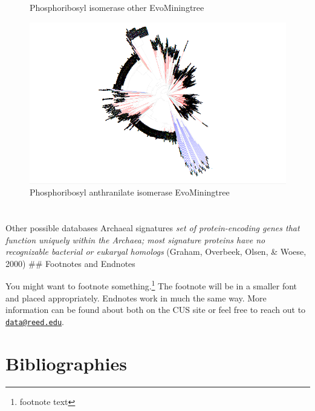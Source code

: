 \documentclass[12pt,twoside]{reedthesis}
\begin{document}
\begin{figure}[h!tbp]
  \caption[Phosphoribosyl isomerase other EvoMiningtree]{\normalsize{Phosphoribosyl isomerase other EvoMiningtree}}
  \label{fig:Phosphoribosyl_isomerase_other_evo_tree}
  \end{figure}\begin{figure}[h!tbp]
  \centering
  \includegraphics[angle = 180,scale = 0.25]{chapter3/tree65.png}
  \caption[Phosphoribosyl anthranilate isomerase EvoMiningtree]{\normalsize{Phosphoribosyl anthranilate isomerase EvoMiningtree}}
  \label{fig:Phosphoribosylanthranilate_isomerase_evo_tree}
  \end{figure}
  
  \clearpage 
  
  \hypertarget{section}{\section{}\label{section}}
  
  Other possible databases Archaeal signatures \emph{set of
  protein-encoding genes that function uniquely within the Archaea; most
  signature proteins have no recognizable bacterial or eukaryal homologs}
  (Graham, Overbeek, Olsen, \& Woese, 2000) \#\# Footnotes and Endnotes
  
  You might want to footnote something.\footnote{footnote text} The
  footnote will be in a smaller font and placed appropriately. Endnotes
  work in much the same way. More information can be found about both on
  the CUS site or feel free to reach out to
  \href{mailto:data@reed.edu}{\nolinkurl{data@reed.edu}}.
  
  \section{Bibliographies}\label{bibliographies}
  
\end{document}
